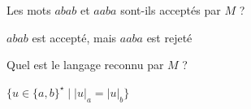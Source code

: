 \begin{exercice}
  \begin{questions}
  \item Les mots $abab$ et $aaba$ sont-ils acceptés par $M$ ? 
  \end{questions}
  \begin{corrections}
    $abab$ est accepté,  mais $aaba$ est rejeté
  \end{corrections}
  
  \begin{questions}
  \item Quel est le langage reconnu par $M$ ? 
  \end{questions}
  \begin{corrections}
    $\{u \in \{a, b\}^\star \mid |u|_a = |u|_b \}$
  \end{corrections}

\end{exercice}

\endgroup
\endinput

